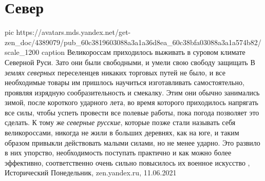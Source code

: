  
 
 
 
 
\chapter{Север}

\ifcmt
  pic https://avatars.mds.yandex.net/get-zen_doc/4389079/pub_60c3819603088a3a1a36d8ea_60c38bfa03088a3a1a574b82/scale_1200
	caption Великороссам приходилось выживать в суровом климате Северной Руси. Зато они были свободными, и умели свою свободу защищать
\fi
В \emph{землях северных} переселенцев никаких торговых путей не было, и все
необходимые товары им пришлось научиться изготавливать самостоятельно, проявляя
изрядную сообразительность и смекалку. Этим они обычно занимались зимой, после
короткого ударного лета, во время которого приходилось напрягать все силы,
чтобы успеть провести все полевые работы, пока погода позволяет это сделать. К
тому же \emph{северные русские}, которые позже стали называть себя
великороссами, никогда не жили в больших деревнях, как на юге, и таким образом
привыкли действовать малыми силами, но не менее ударно. Это развило в них
упорство, необходимость поступать практично и как можно более эффективно,
соответственно очень сильно повысилось их военное искусство
, 
Исторический Понедельник, zen.yandex.ru, 11.06.2021

